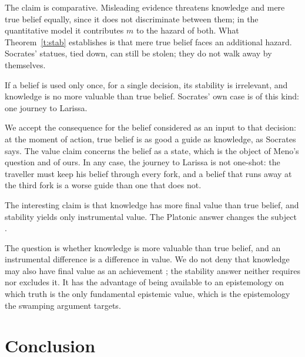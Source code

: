 \documentclass{situationist-preprint}
\begin{document}
\begin{reply}
The claim is comparative. Misleading evidence threatens knowledge and mere true belief equally, since it does not discriminate between them; in the quantitative model it contributes $m$ to the hazard of both. What Theorem~\ref{t:stab} establishes is that mere true belief faces an additional hazard. Socrates' statues, tied down, can still be stolen; they do not walk away by themselves.
\end{reply}

\begin{objection}
If a belief is used only once, for a single decision, its stability is irrelevant, and knowledge is no more valuable than true belief. Socrates' own case is of this kind: one journey to Larissa.
\end{objection}

\begin{reply}
We accept the consequence for the belief considered as an input to that decision: at the moment of action, true belief is as good a guide as knowledge, as Socrates says. The value claim concerns the belief as a state, which is the object of Meno's question and of ours. In any case, the journey to Larissa is not one-shot: the traveller must keep his belief through every fork, and a belief that runs away at the third fork is a worse guide than one that does not.
\end{reply}

\begin{objection}
The interesting claim is that knowledge has more final value than true belief, and stability yields only instrumental value. The Platonic answer changes the subject \citep{PritchardMillarHaddock2010}.
\end{objection}

\begin{reply}
The question is whether knowledge is more valuable than true belief, and an instrumental difference is a difference in value. We do not deny that knowledge may also have final value as an achievement \citep{Greco2010}; the stability answer neither requires nor excludes it. It has the advantage of being available to an epistemology on which truth is the only fundamental epistemic value, which is the epistemology the swamping argument targets.
\end{reply}

\section{Conclusion}
\end{document}
